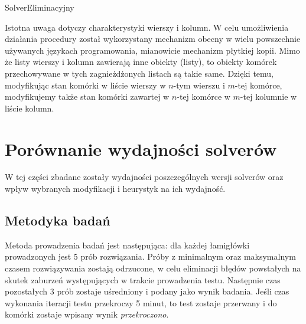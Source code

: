 \begin{pseudokod}[H]
    \caption{SolverEliminacyjny}\label{alg:eliminationSolver}
\end{pseudokod}

    Istotna uwaga dotyczy charakterystyki wierszy i kolumn. W celu umożliwienia działania procedury
został wykorzystany mechanizm obecny w wielu powszechnie używanych językach programowania, mianowicie
mechanizm płytkiej kopii. Mimo że listy wierszy i kolumn zawierają inne obiekty (listy), to obiekty
komórek przechowywane w tych zagnieżdżonych listach są takie same. Dzięki temu, modyfikując stan
komórki w liście wierszy w $n$-tym wierszu i $m$-tej komórce, modyfikujemy także stan komórki
zawartej w $n$-tej komórce w $m$-tej kolumnie w liście kolumn.



\section{Porównanie wydajności solverów}
    W tej części zbadane zostały wydajności poszczególnych wersji solverów oraz wpływ wybranych
modyfikacji i heurystyk na ich wydajność.


\subsection{Metodyka badań}
    Metoda prowadzenia badań jest następująca: dla każdej łamigłówki prowadzonych jest 5 prób 
rozwiązania. Próby z minimalnym oraz maksymalnym czasem rozwiązywania zostają odrzucone, w celu
eliminacji błędów powstałych na skutek zaburzeń występujących w trakcie prowadzenia testu. Następnie
czas pozostałych 3 prób zostaje uśredniony i podany jako wynik badania. Jeśli czas wykonania
iteracji testu przekroczy 5 minut, to test zostaje przerwany i do komórki zostaje wpisany wynik
\textit{przekroczono}.

